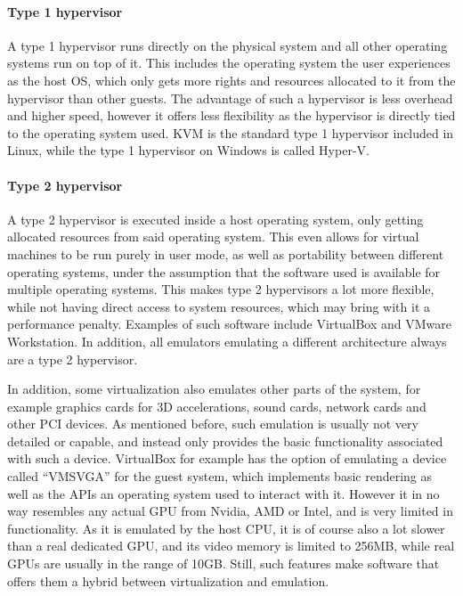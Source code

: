 \paragraph{Type 1 hypervisor} A type 1 hypervisor runs directly on the physical system
and all other operating systems run on top of it.
This includes the operating system the user experiences as the host OS,
which only gets more rights and resources allocated to it from the hypervisor than other guests.
The advantage of such a hypervisor is less overhead and higher speed,
however it offers less flexibility as the hypervisor is directly tied to the operating system used.
KVM is the standard type 1 hypervisor included in Linux,
while the type 1 hypervisor on Windows is called Hyper-V\cite{hypervisor}.

\paragraph{Type 2 hypervisor} A type 2 hypervisor is executed inside a host operating system,
only getting allocated resources from said operating system.
This even allows for virtual machines to be run purely in user mode,
as well as portability between different operating systems,
under the assumption that the software used is available for multiple operating systems.
This makes type 2 hypervisors a lot more flexible,
while not having direct access to system resources,
which may bring with it a performance penalty.
Examples of such software include VirtualBox and VMware Workstation\cite{hypervisor}.
In addition, all emulators emulating a different architecture always are a type 2 hypervisor.

In addition, some virtualization also emulates other parts of the system,
for example graphics cards for 3D accelerations, sound cards, network cards
and other PCI devices.
As mentioned before, such emulation is usually not very detailed or capable,
and instead only provides the basic functionality associated with such a device.
VirtualBox for example has the option of emulating a device called \enquote{VMSVGA}
for the guest system, which implements basic rendering as well as the APIs
an operating system used to interact with it.
However it in no way resembles any actual GPU from Nvidia, AMD or Intel,
and is very limited in functionality.
As it is emulated by the host CPU, it is of course also a lot slower than a real dedicated GPU,
and its video memory is limited to 256MB, while real GPUs are usually in the range of 10GB.
Still, such features make software that offers them a hybrid between virtualization and emulation.

